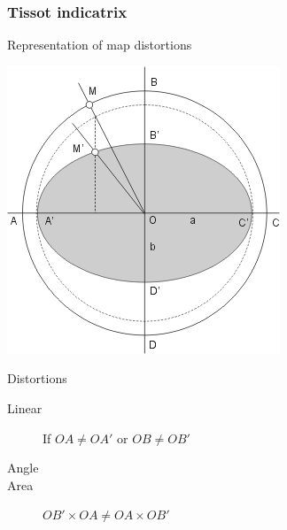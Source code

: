 \documentclass[17pt]{beamer}
\begin{document}
\begin{frame}
  \frametitle{Tissot indicatrix}
  \begin{block}{Representation of map distortions}
    \begin{center}
      \includegraphics[scale=0.5]{pycon-2011-tutorial-files/indicatrix.png}
    \end{center}
  \end{block}
  \begin{block}{Distortions}
    \begin{description}
    \item[Linear] If $OA \neq OA'$ or $OB \neq OB'$
    \item[Angle]
    \item[Area] $OB' \times OA \neq OA \times OB'$
    \end{description}

  \end{block}
\end{frame}
\end{document}
